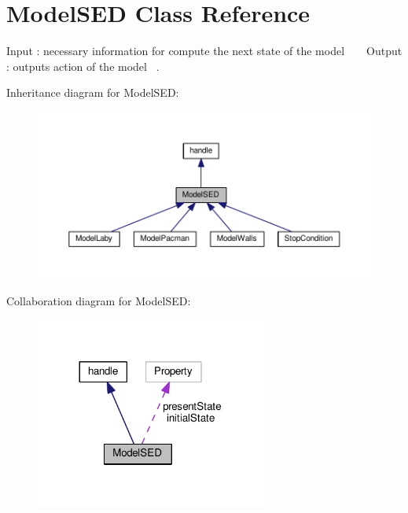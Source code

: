 \hypertarget{class_model_s_e_d}{}\section{Model\+S\+ED Class Reference}
\label{class_model_s_e_d}


Input \+: necessary information for compute the next state of the model ~\newline
~\newline
Output \+: output\textquotesingle{}s action of the model~\newline
.  




Inheritance diagram for Model\+S\+ED\+:
\nopagebreak
\begin{figure}[H]
\begin{center}
\leavevmode
\includegraphics[width=350pt]{class_model_s_e_d__inherit__graph}
\end{center}
\end{figure}


Collaboration diagram for Model\+S\+ED\+:
\nopagebreak
\begin{figure}[H]
\begin{center}
\leavevmode
\includegraphics[width=216pt]{class_model_s_e_d__coll__graph}
\end{center}
\end{figure}
